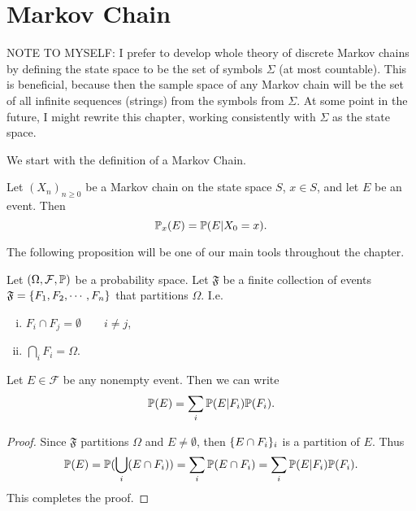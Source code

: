 \chapter{Markov Chain}
NOTE TO MYSELF: I prefer to develop whole theory of discrete Markov chains by defining the state space to be the set of symbols $\Sigma$ (at most countable). This is beneficial, because then the sample space of any Markov chain will be the set of all infinite sequences (strings) from the symbols from $\Sigma$. At some point in the future, I might rewrite this chapter, working consistently with $\Sigma$ as the state space.

We start with the definition of a Markov Chain.
\begin{notation}
	Let $(X_n)_{n\geq0}$ be a Markov chain on the state space $S$, $x\in S$, and let $E$ be an event. Then
	\[  \mathbb{P}_x(E) = \mathbb{P}(E|X_0=x) . \]
\end{notation}
The following proposition will be one of our main tools throughout the chapter.
\begin{proposition}
	Let $(\Omega, \mathcal{F}, \mathbb{P})$ be a probability space. Let $\mathfrak{F}$ be a finite collection of events $\mathfrak{F} = \{F_1,F_2,\cdots, F_n\}$ that partitions $\Omega$. I.e.
	\begin{enumerate}[(i)]
		\item $F_i \cap F_j = \emptyset \qquad i\neq j$,
		\item $\bigcap_{i} F_i = \Omega$.
	\end{enumerate}
	Let $E \in \mathcal{F}$ be any nonempty event. Then we can write
	\[  \mathbb{P}(E) = \sum_{i} \mathbb{P}(E|F_i)\mathbb{P}(F_i). \]
\end{proposition}
\begin{proof}
	Since $\mathfrak{F}$ partitions $\Omega$ and $E \neq \emptyset$, then $\{E\cap F_i\}_i$ is a partition of $E$. Thus
	\[ \mathbb{P}(E) = \mathbb{P}(\bigcup_i (E \cap F_i)) = \sum_i \mathbb{P}(E \cap F_i) = \sum_i \mathbb{P}(E|F_i)\mathbb{P}(F_i). \]
	This completes the proof.
\end{proof}



